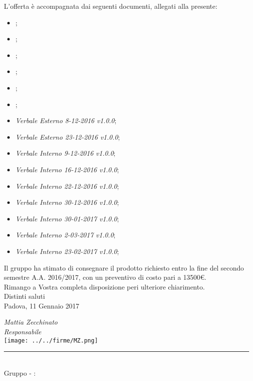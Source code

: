 \begin{titlepage}
\begin{large}
	L'offerta è accompagnata dai seguenti documenti, allegati alla presente:
	\begin{itemize}
		\item \AnalisiDeiRequisiti{};
		\item \Glossario{};
		\item \NormeDiProgetto{};
		\item \PianoDiProgetto{};
		\item \PianoDiQualifica{};
		\item \SpecificaTecnica{};
		\item \emph{Verbale Esterno 8-12-2016 v1.0.0};
		\item \emph{Verbale Esterno 23-12-2016 v1.0.0};
		\item \emph{Verbale Interno 9-12-2016 v1.0.0};
		\item \emph{Verbale Interno 16-12-2016 v1.0.0};
		\item \emph{Verbale Interno 22-12-2016 v1.0.0};
		\item \emph{Verbale Interno 30-12-2016 v1.0.0};
		\item \emph{Verbale Interno 30-01-2017 v1.0.0};
		\item \emph{Verbale Interno 2-03-2017 v1.0.0};
		\item \emph{Verbale Interno 23-02-2017 v1.0.0};
	\end{itemize}
	\vspace{0.3cm}
	Il gruppo \GroupName{} ha stimato di consegnare il prodotto richiesto entro la fine del secondo semestre A.A. 2016/2017, con un preventivo di costo pari a 13500€.\\
	
	Rimango a Vostra completa disposizione peri ulteriore chiarimento. \\
	Distinti saluti\\
	 
	Padova, 11 Gennaio 2017
	\begin{flushright}
		\emph{Mattia Zecchinato} \\ 
		\emph{Responsabile \GroupName{}} \\
		\texttt{[image: ../../firme/MZ.png]}
 	\end{flushright}
	
	\end{large}
	
	\begin{center}
		\rule{13cm}{0,03cm} \\
		Gruppo \GroupName{} - \email: \GroupEmail{}
	\end{center} 
	
	
\end{titlepage}
  
 \restoregeometry
